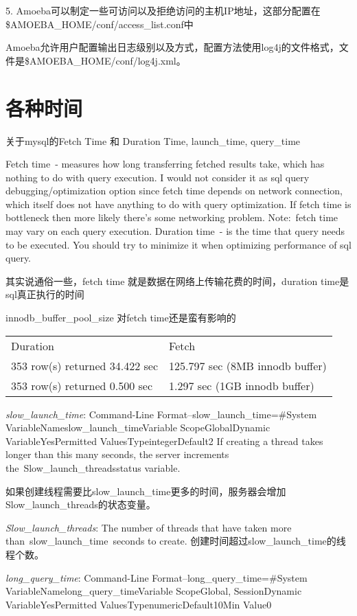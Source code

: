 5.	Amoeba可以制定一些可访问以及拒绝访问的主机IP地址，这部分配置在\$AMOEBA_HOME/conf/access_list.conf中

Amoeba允许用户配置输出日志级别以及方式，配置方法使用log4j的文件格式，文件是\$AMOEBA_HOME/conf/log4j.xml。


\section{各种时间}
关于mysql的Fetch Time 和 Duration Time, launch_time, query_time

Fetch time - measures how long transferring fetched results take, which has nothing to do with query execution. I would not consider it as sql query debugging/optimization option since fetch time depends on network connection, which itself does not have anything to do with query optimization. If fetch time is bottleneck then more likely there's some networking problem.
Note: fetch time may vary on each query execution.
Duration time - is the time that query needs to be executed. You should try to minimize it when optimizing performance of sql query.
 
其实说通俗一些，fetch time 就是数据在网络上传输花费的时间，duration time是sql真正执行的时间

 innodb_buffer_pool_size 对fetch time还是蛮有影响的
 
 \begin{tabular*}{\textwidth}{ll}
                    Duration & Fetch \\
353 row(s) returned 34.422 sec & 125.797 sec (8MB innodb buffer) \\
353 row(s) returned 0.500 sec & 1.297 sec (1GB innodb buffer)
 \end{tabular*}
 
\textit{slow_launch_time}:
Command-Line Format--slow_launch_time=\#System VariableNameslow_launch_timeVariable ScopeGlobalDynamic VariableYesPermitted ValuesTypeintegerDefault2
If creating a thread takes longer than this many seconds, the server increments the Slow_launch_threadsstatus variable.

如果创建线程需要比slow_launch_time更多的时间，服务器会增加Slow_launch_threads的状态变量。

 \textit{Slow_launch_threads}:
 The number of threads that have taken more than slow_launch_time seconds to create.
创建时间超过slow_launch_time的线程个数。

\textit{long_query_time}:
Command-Line Format--long_query_time=\#System VariableNamelong_query_timeVariable ScopeGlobal, SessionDynamic VariableYesPermitted ValuesTypenumericDefault10Min Value0

